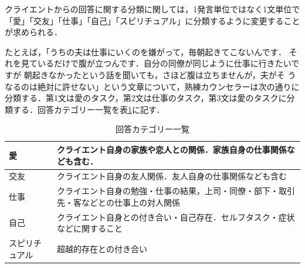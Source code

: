 \documentclass[shuuron]{kuee}
\begin{document}
クライエントからの回答に関する分類に関しては，1発言単位ではなく1文単位で「愛」「交友」「仕事」「自己」「スピリチュアル」に分類するように変更することが求められる．

たとえば，「うちの夫は仕事にいくのを嫌がって，毎朝起きてこないんです．
それを見ているだけで腹が立つんです．自分の同僚が同じように仕事に行きたいですが
朝起きなかったという話を聞いても，さほど腹は立ちませんが，夫がそ
うなるのは絶対に許せない」という文章について，熟練カウンセラーは次の通りに分類する．第1文は愛のタスク，第2文は仕事のタスク，第3文は愛のタスクに分類する．回答カテゴリー一覧を表\ref{table:ansCate}に記す．

\begin{table}
  \caption{回答カテゴリー一覧}
  \label{table:ansCate}
  \begin{center}
    \begin{tabular}{|l|p{7cm}|} \hline
      愛 & クライエント自身の家族や恋人との関係．家族自身の仕事関係なども含む．
      \\ \hline
      交友  & クライエント自身の友人関係．友人自身の仕事関係なども含む
      \\ \hline
      仕事 & クライエント自身の勉強・仕事の結果，上司・同僚・部下・取引先・客などとの仕事上の対人関係
      \\ \hline
      自己  &  クライエント自身との付き合い・自己存在．セルフタスク・症状などに関すること
      \\ \hline
      スピリチュアル & 超越的存在との付き合い
      \\ \hline
    \end{tabular}
  \end{center}
\end{table}

\end{document}
